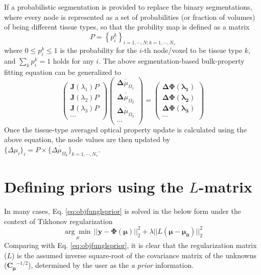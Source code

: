 \documentclass[12pt]{book}               %
\begin{document}
If a probabilistic segmentation is provided to replace the binary segmentations, where every node is represented as a set of probabilities (or fraction of volumes) of being different tissue types, so that the probility map is defined as a matrix
\begin{equation}
P=\left\{p^k_{i}\right\}_{i=1,\cdots,N; k=1,\cdots,N_s}
\end{equation}
where $0\le p^k_{i} \le 1$ is the probability for the $i$-th node/voxel to be tissue type $k$, and $\sum_k{p^k_{i}}=1$ holds for any $i$. The above segmentation-based bulk-property fitting equation can be generalized to
\begin{equation}\label{eq:multispectral}
\left(
\begin{array}{c}
\mathbf{J}(\lambda_1)P\\
\mathbf{J}(\lambda_2)P\\
\mathbf{J}(\lambda_3)P\\
\cdots 
\end{array}\right)
\left(
\begin{array}{c}
\overline{\boldsymbol{\Delta}{\mu_{\Omega_1}}}\\
\overline{\boldsymbol{\Delta}{\mu_{\Omega_2}}}\\
\overline{\boldsymbol{\Delta}{\mu_{\Omega_3}}}\\
\cdots
\end{array}
\right)=\left(
\begin{array}{c}
\boldsymbol{\Delta\Phi(\lambda_1)}\\
\boldsymbol{\Delta\Phi(\lambda_2)}\\
\boldsymbol{\Delta\Phi(\lambda_3)}\\
\cdots
\end{array}\right)
\end{equation}
Once the tissue-type averaged optical property update is calculated using the above equation, the node values are then updated by $\{\Delta\mu_i\}_i=P\times\{\overline{\Delta\mu_{\Omega_k}}\}_{k=1,\cdots,N_s}$.

\section{Defining priors using the $L$-matrix}\label{sec:Lmatrix}
In many cases, Eq. \ref{eq:objfunglsprior} is solved in the below form under the context of Tikhonov regularization
\begin{equation}
\underset{\mu}{\arg\min} \, || \boldsymbol{y-\Phi(\mu)} ||^2_2 + \lambda|| L(\boldsymbol{\mu-\mu_0}) ||^2_2
\end{equation}
Comparing with Eq. \ref{eq:objfunglsprior}, it is clear that the regularization matrix ($L$) is the assumed inverse square-root of the covariance matrix of the unknowns ($\mathbf{C_\mu}^{-1/2}$), determined by the user as the \emph{a prior} information.
\end{document}
